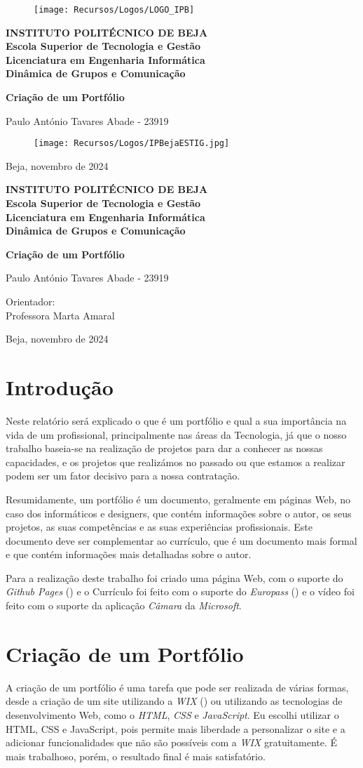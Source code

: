 \documentclass[a4paper]{article}
\newcommand{\firsttitlepage}{
    \begin{titlepage}
        \centering
        \vspace*{1cm}
        
        \begin{figure}[h!]
            \centering
            \texttt{[image: Recursos/Logos/LOGO\_IPB]} %
            \vspace{0.5cm}
        \end{figure}

        \large\textbf{INSTITUTO POLITÉCNICO DE BEJA} \\
        \large\textbf{Escola Superior de Tecnologia e Gestão} \\
        \large\textbf{Licenciatura em Engenharia Informática} \\
        \large\textbf{Dinâmica de Grupos e Comunicação} \\
        
        \vspace{2cm}
        
        {\Huge \textbf{Criação de um Portfólio}} \\
        
        \vspace{1.5cm}
        
        \large Paulo António Tavares Abade - 23919 \\
        
        \vfill
        
        \begin{figure}[h!]
            \centering
            \texttt{[image: Recursos/Logos/IPBejaESTIG.jpg]} %
        \end{figure}
        
        \vspace{1cm}
        
        {\large Beja, novembro de 2024}
    \end{titlepage}
}
\newcommand{\secondtitlepage}{
    \begin{titlepage}
        \centering
        \vspace*{1cm}
        
        \large\textbf{INSTITUTO POLITÉCNICO DE BEJA} \\
        \large\textbf{Escola Superior de Tecnologia e Gestão} \\
        \large\textbf{Licenciatura em Engenharia Informática} \\
        \large\textbf{Dinâmica de Grupos e Comunicação} \\
        
        \vspace{2cm}
        
        {\Huge \textbf{Criação de um Portfólio}} \\
        
        \vspace{1.5cm}
        
        \large Paulo António Tavares Abade - 23919 \\

        \vspace{2cm}

        \large Orientador:\\ Professora Marta Amaral
        
        \vfill
        
        {\large Beja, novembro de 2024}
    \end{titlepage}
}
\begin{document}


\firsttitlepage


\secondtitlepage


\newpage

\renewcommand{\contentsname}{Indíce}
\renewcommand{\refname}{Bibliografia}
\renewcommand{\thefigure}{\thesection.\arabic{figure}}

\newpage
{}
\doublespacing
\tableofcontents
\doublespacing

\newpage
{}

\section{Introdução}\label{intro}
Neste relatório será explicado o que é um portfólio e qual a sua importância na vida de um profissional, principalmente nas 
áreas da Tecnologia, já que o nosso trabalho baseia-se na realização de projetos para dar a conhecer as nossas capacidades, 
e os projetos que realizámos no passado ou que estamos a realizar podem ser um fator decisivo para a nossa contratação.

Resumidamente, um portfólio é um documento, geralmente em páginas Web, no caso dos informáticos e designers, que contém
informações sobre o autor, os seus projetos, as suas competências e as suas experiências profissionais. Este documento deve ser 
complementar ao currículo, que é um documento mais formal e que contém informações mais detalhadas sobre o autor.


Para a realização deste trabalho foi criado uma página Web, com o suporte do \textit{Github Pages} (\cite{gitpages})
e o Currículo foi feito com o suporte do \textit{Europass} (\cite{europass}) e o vídeo foi feito com o suporte da aplicação \textit{Câmara} 
da \textit{Microsoft}.

\newpage
\section{Criação de um Portfólio}\label{criacao}
A criação de um portfólio é uma tarefa que pode ser realizada de várias formas, desde a criação 
de um site utilizando a \textit{WIX} (\cite{WIX}) ou utilizando as tecnologias de desenvolvimento Web, 
como o \textit{HTML}, \textit{CSS} e \textit{JavaScript}. Eu escolhi utilizar o HTML, CSS e JavaScript, 
pois permite mais liberdade a personalizar o site e a adicionar funcionalidades que não são possíveis
com a \textit{WIX} gratuitamente. É mais trabalhoso, porém, o resultado final é mais satisfatório.
\end{document}
